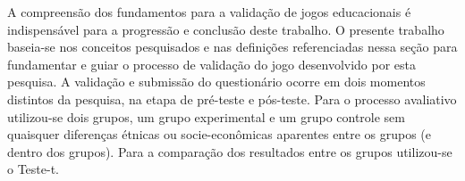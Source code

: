 
\vspace{-0.1cm}

A compreensão dos fundamentos para a validação de jogos educacionais é indispensável para a progressão e conclusão deste trabalho. O presente trabalho baseia-se nos conceitos pesquisados e nas definições referenciadas nessa seção para fundamentar e guiar o processo de validação do jogo desenvolvido por esta pesquisa. A validação e submissão do questionário ocorre em dois momentos distintos da pesquisa, na etapa de pré-teste e pós-teste. Para o processo avaliativo utilizou-se dois grupos, um grupo experimental e um grupo controle sem quaisquer diferenças étnicas ou socie-econômicas aparentes entre os grupos (e dentro dos grupos). Para a comparação dos resultados entre os grupos utilizou-se o Teste-t. 




